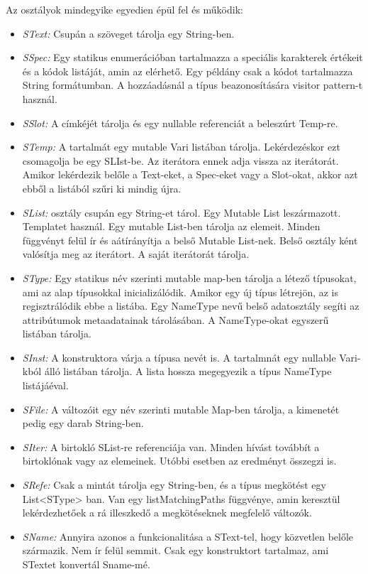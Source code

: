 {Az osztályok mindegyike egyedien épül fel és működik:
\begin{itemize}
\item \emph{SText:} 
Csupán a szöveget tárolja egy String-ben.
\item \emph{SSpec:} 
Egy statikus enumerációban tartalmazza a speciális karakterek értékeit és a kódok listáját, amin az elérhető.
Egy példány csak a kódot tartalmazza String formátumban.
A hozzáadásnál a típus beazonosítására visitor pattern-t használ.
\item \emph{SSlot:} 
A címkéjét tárolja és egy nullable referenciát a beleszúrt Temp-re.
\item \emph{STemp:} 
A tartalmát egy mutable Vari listában tárolja.
Lekérdezéskor ezt csomagolja be egy SLIst-be.
Az iterátora ennek adja vissza az iterátorát.
Amikor lekérdezik belőle a Text-eket, a Spec-eket vagy a Slot-okat, akkor azt ebből a listából szűri ki mindig újra.
\item \emph{SList:} osztály csupán egy String-et tárol.
Egy Mutable List leszármazott.
Templatet használ.
Egy mutable List-ben tárolja az elemeit.
Minden függvényt felül ír és aátírányítja a belső Mutable List-nek.
Belső osztály ként valósítja meg az iterátort.
A saját iterátorát tárolja.
\item \emph{SType:} 
Egy statikus név szerinti mutable map-ben tárolja a létező típusokat, ami az alap típusokkal inicializálódik.
Amikor egy új típus létrejön, az is regisztrálódik ebbe a listába.
Egy NameType nevű belső adatosztály segíti az attribútumok metaadatainak tárolásában.
A NameType-okat egyszerű listában tárolja.
\item \emph{SInst:} 
A konstruktora várja a típusa nevét is.
A tartalmnát egy nullable Vari-kból álló listában tárolja.
A lista hossza megegyezik a típus NameType listájáéval.
\item \emph{SFile:}
A változóit egy név szerinti mutable Map-ben tárolja, a kimenetét pedig egy darab String-ben.
\item \emph{SIter:}
A birtokló SList-re referenciája van.
Minden hívást továbbít a birtoklónak vagy az elemeinek.
Utóbbi esetben az eredményt összegzi is.
\item \emph{SRefe:}
Csak a mintát tárolja egy String-ben, és a típus megkötést egy List<SType> ban.
Van egy listMatchingPaths függvénye, amin keresztül lekérdezhetőek a rá illeszkedő a megkötéseknek megfelelő változók.
\item \emph{SName:} 
Annyira azonos a funkcionalitása a SText-tel, hogy közvetlen belőle származik.
Nem ír felül semmit.
Csak egy konstruktort tartalmaz, ami STextet konvertál Sname-mé.
\end{itemize}

}
